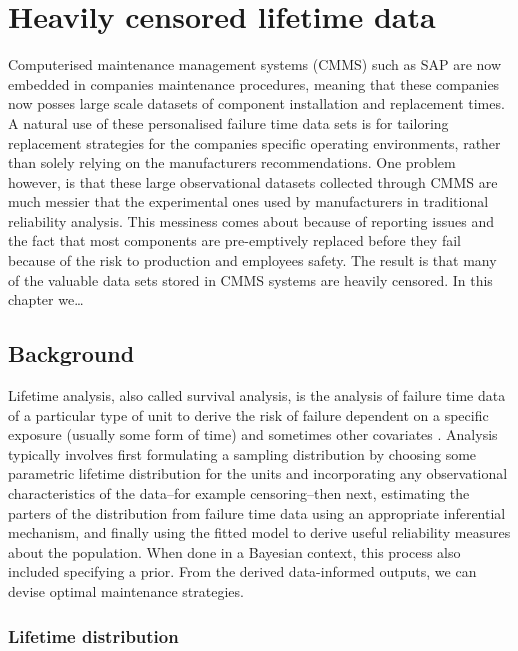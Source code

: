 \chapter{Heavily censored lifetime data}\label{chap:chapter2}

Computerised maintenance management systems (CMMS) such as SAP \citep{sap} are now embedded in companies maintenance procedures, meaning that these companies now posses large scale datasets of component installation and replacement times. A natural use of these personalised failure time data sets is for tailoring replacement strategies for the companies specific operating environments, rather than solely relying on the manufacturers recommendations. One problem however, is that these large observational datasets collected through CMMS are much messier that the experimental ones used by manufacturers in traditional reliability analysis. This messiness comes about because of reporting issues and the fact that most components are pre-emptively replaced before they fail because of the risk to production and employees safety. The result is that many of the valuable data sets stored in CMMS systems are heavily censored. In this chapter we\ldots

\section{Background}

Lifetime analysis, also called survival analysis, is the analysis of failure time data of a particular type of unit to derive the risk of failure dependent on a specific exposure (usually some form of time) and sometimes other covariates \citep{moore_survival_2016}. Analysis typically involves first formulating a sampling distribution by choosing some parametric lifetime distribution for the units and incorporating any observational characteristics of the data--for example censoring--then next, estimating the parters of the distribution from failure time data using an appropriate inferential mechanism, and finally using the fitted model to derive useful reliability measures about the population. When done in a Bayesian context, this process also included specifying a prior. From the derived data-informed outputs, we can devise optimal maintenance strategies.

\subsection{Lifetime distribution}

